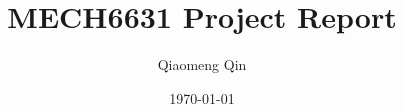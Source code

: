 \makeatletter
\title{MECH6631 Project Report}	\let\Title\@title
\author{Qiaomeng Qin}	\let\Author\@author
\date{\today} \let\Date\@date
\makeatother

\newcommand{\StudentId}{Qiaomeng Qin}
\newcommand{\AcademicYear}{Academic Year 2021 -- }